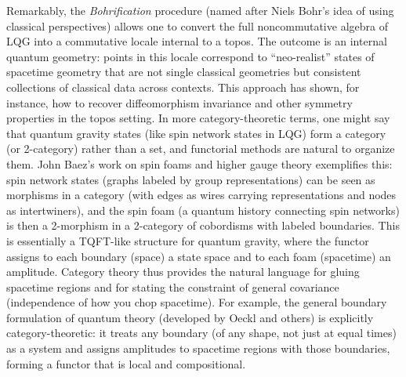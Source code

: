 \documentclass[12pt]{article}
\begin{document}
Remarkably, the \emph{Bohrification} procedure (named after Niels Bohr’s idea of using classical perspectives) allows one to convert the full noncommutative algebra of LQG into a commutative locale internal to a topos. The outcome is an internal quantum geometry: points in this locale correspond to ``neo-realist'' states of spacetime geometry that are not single classical geometries but consistent collections of classical data across contexts. This approach has shown, for instance, how to recover diffeomorphism invariance and other symmetry properties in the topos setting. In more category-theoretic terms, one might say that quantum gravity states (like spin network states in LQG) form a category (or 2-category) rather than a set, and functorial methods are natural to organize them. John Baez’s work on spin foams and higher gauge theory exemplifies this: spin network states (graphs labeled by group representations) can be seen as morphisms in a category (with edges as wires carrying representations and nodes as intertwiners), and the spin foam (a quantum history connecting spin networks) is then a 2-morphism in a 2-category of cobordisms with labeled boundaries. This is essentially a TQFT-like structure for quantum gravity, where the functor assigns to each boundary (space) a state space and to each foam (spacetime) an amplitude. Category theory thus provides the natural language for gluing spacetime regions and for stating the constraint of general covariance (independence of how you chop spacetime). For example, the general boundary formulation of quantum theory (developed by Oeckl and others) is explicitly category-theoretic: it treats any boundary (of any shape, not just at equal times) as a system and assigns amplitudes to spacetime regions with those boundaries, forming a functor that is local and compositional.
\end{document}

